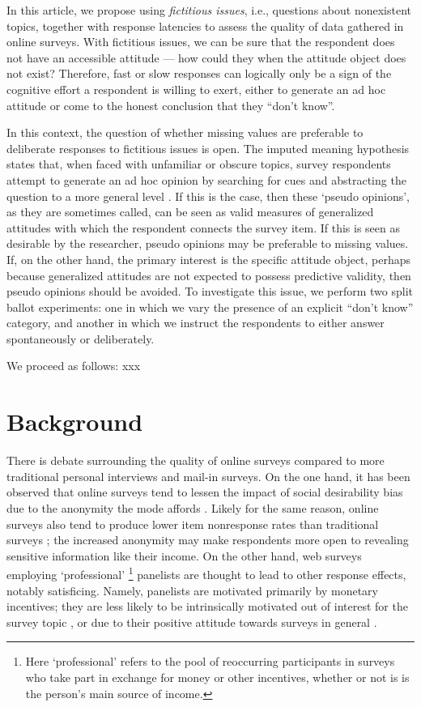 \documentclass[Royal,times,sageh]{sagej}
\begin{document}
In this article, we propose using \textit{fictitious issues}, i.e.,
questions about nonexistent topics, together with response latencies to
assess the quality of data gathered in online surveys. With fictitious
issues, we can be sure that the respondent does not have an accessible
attitude --- how could they when the attitude object does not exist?
Therefore, fast or slow responses can logically only be a sign of the
cognitive effort a respondent is willing to exert, either to generate an
ad hoc attitude or come to the honest conclusion that they ``don't
know''.

In this context, the question of whether missing values are preferable
to deliberate responses to fictitious issues is open. The imputed
meaning hypothesis states that, when faced with unfamiliar or obscure
topics, survey respondents attempt to generate an ad hoc opinion by
searching for cues and abstracting the question to a more general level
\citep{Sturgis2010}. If this is the case, then these `pseudo opinions',
as they are sometimes called, can be seen as valid measures of
generalized attitudes with which the respondent connects the survey
item. If this is seen as desirable by the researcher, pseudo opinions
may be preferable to missing values. If, on the other hand, the primary
interest is the specific attitude object, perhaps because generalized
attitudes are not expected to possess predictive validity, then pseudo
opinions should be avoided. To investigate this issue, we perform two
split ballot experiments: one in which we vary the presence of an
explicit ``don't know'' category, and another in which we instruct the
respondents to either answer spontaneously or deliberately.

We proceed as follows: xxx

\hypertarget{background}{%
\section{Background}\label{background}}

There is debate surrounding the quality of online surveys compared to
more traditional personal interviews and mail-in surveys. On the one
hand, it has been observed that online surveys tend to lessen the impact
of social desirability bias due to the anonymity the mode affords
\citep{Silber2013, Chang2009, Kreuter2008, deLeeuw2005}. Likely for the
same reason, online surveys also tend to produce lower item nonresponse
rates than traditional surveys \citep{Shin2011}; the increased anonymity
may make respondents more open to revealing sensitive information like
their income. On the other hand, web surveys employing `professional'
\footnote{Here `professional' refers to the pool of reoccurring
  participants in surveys who take part in exchange for money or other
  incentives, whether or not is is the person's main source of income.}
panelists are thought to lead to other response effects, notably
satisficing. Namely, panelists are motivated primarily by monetary
incentives; they are less likely to be intrinsically motivated out of
interest for the survey topic \citep{Silber2013}, or due to their
positive attitude towards surveys in general
\citep{Stocke2004a, Stocke2004c}.
\end{document}
